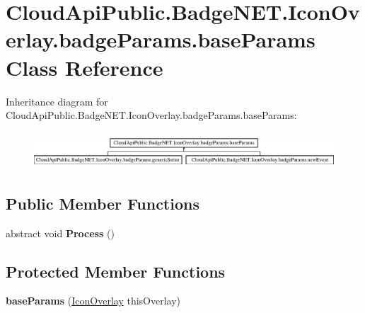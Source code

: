 \hypertarget{class_cloud_api_public_1_1_badge_n_e_t_1_1_icon_overlay_1_1badge_params_1_1base_params}{\section{Cloud\-Api\-Public.\-Badge\-N\-E\-T.\-Icon\-Overlay.\-badge\-Params.\-base\-Params Class Reference}
\label{class_cloud_api_public_1_1_badge_n_e_t_1_1_icon_overlay_1_1badge_params_1_1base_params}
}
Inheritance diagram for Cloud\-Api\-Public.\-Badge\-N\-E\-T.\-Icon\-Overlay.\-badge\-Params.\-base\-Params\-:\begin{figure}[H]
\begin{center}
\leavevmode
\includegraphics[height=1.379310cm]{class_cloud_api_public_1_1_badge_n_e_t_1_1_icon_overlay_1_1badge_params_1_1base_params}
\end{center}
\end{figure}
\subsection*{Public Member Functions}
\begin{DoxyCompactItemize}
\item 
\hypertarget{class_cloud_api_public_1_1_badge_n_e_t_1_1_icon_overlay_1_1badge_params_1_1base_params_a084f9980a716a2fc9e3932e9793444f6}{abstract void {\bfseries Process} ()}\label{class_cloud_api_public_1_1_badge_n_e_t_1_1_icon_overlay_1_1badge_params_1_1base_params_a084f9980a716a2fc9e3932e9793444f6}

\end{DoxyCompactItemize}
\subsection*{Protected Member Functions}
\begin{DoxyCompactItemize}
\item 
\hypertarget{class_cloud_api_public_1_1_badge_n_e_t_1_1_icon_overlay_1_1badge_params_1_1base_params_a528fb20815aa0c5ef63d488c4fbfb2b0}{{\bfseries base\-Params} (\hyperlink{class_cloud_api_public_1_1_badge_n_e_t_1_1_icon_overlay}{Icon\-Overlay} this\-Overlay)}\label{class_cloud_api_public_1_1_badge_n_e_t_1_1_icon_overlay_1_1badge_params_1_1base_params_a528fb20815aa0c5ef63d488c4fbfb2b0}

\end{DoxyCompactItemize}
